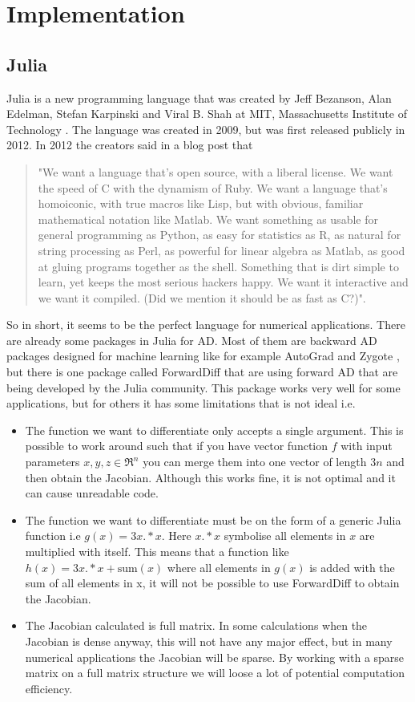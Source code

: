 \chapter{Implementation}
\section{Julia}
Julia is a new programming language that was created by Jeff Bezanson, Alan Edelman, Stefan Karpinski and Viral B. Shah  at MIT, Massachusetts Institute of Technology \emph{\citep{juliaLab}}. The language was created in 2009, but was first released publicly in 2012. In 2012 the creators said in a blog post \emph{\citep{juliaBlogRelease2012}} that
\begin{quotation}
"We want a language that’s open source, with a liberal license. We want the speed of C with the dynamism of Ruby. We want a language that’s homoiconic, with true macros like Lisp, but with obvious, familiar mathematical notation like Matlab. We want something as usable for general programming as Python, as easy for statistics as R, as natural for string processing as Perl, as powerful for linear algebra as Matlab, as good at gluing programs together as the shell. Something that is dirt simple to learn, yet keeps the most serious hackers happy. We want it interactive and we want it compiled. (Did we mention it should be as fast as C?)".
\end{quotation}
So in short, it seems to be the perfect language for numerical applications. There are already some packages in Julia for AD. Most of them are backward AD packages designed for machine learning like for example AutoGrad \emph{\citep{knet2016mlsys}} and Zygote \emph{\citep{innes2018don}}, but there is one package called ForwardDiff \emph{\citep{ForwardDiff}} that are using forward AD that are being developed by the Julia community. This package works very well for some applications, but for others it has some limitations that is not ideal i.e. 
\begin{itemize}
    \item The function we want to differentiate only accepts a single argument. This is possible to work around such that if you have vector function $f$ with input parameters $x,y,z \in \Re^n$ you can merge them into one vector of length $3n$ and then obtain the Jacobian. Although this works fine, it is not optimal and it can cause unreadable code.
    \item The function we want to differentiate must be on the form of a generic Julia function i.e $g(x) = 3x.*x$. Here $x.*x$ symbolise all elements in $x$ are multiplied with itself. This means that a function like $h(x) = 3x.*x + \text{sum}(x)$ where all elements in $g(x)$ is added with the sum of all elements in x, it will not be possible to use ForwardDiff to obtain the Jacobian.
    \item The Jacobian calculated is full matrix. In some calculations when the Jacobian is dense anyway, this will not have any major effect, but in many numerical applications the Jacobian will be sparse. By working with a sparse matrix on a full matrix structure we will loose a lot of potential computation efficiency.
\end{itemize}

